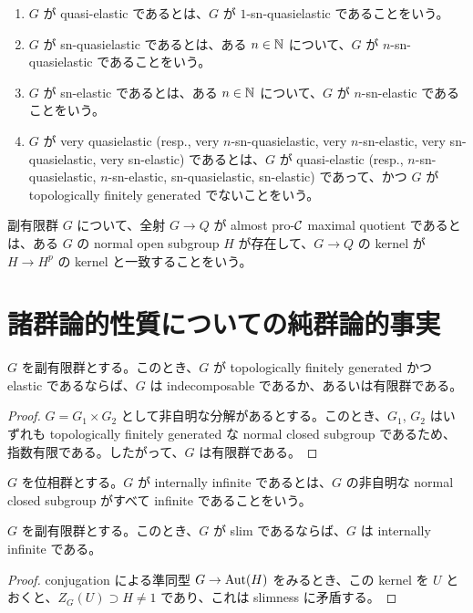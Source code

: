 \begin{defn}
\begin{enumerate}
    \item $G$ が quasi-elastic であるとは、$G$ が $1$-sn-quasielastic であることをいう。
    \item $G$ が sn-quasielastic であるとは、ある $n \in \mathbb{N}$ について、$G$ が $n$-sn-quasielastic であることをいう。
    \item $G$ が sn-elastic であるとは、ある $n \in \mathbb{N}$ について、$G$ が $n$-sn-elastic であることをいう。
    \item $G$ が very quasielastic (resp., very $n$-sn-quasielastic, very $n$-sn-elastic, very sn-quasielastic, very sn-elastic) であるとは、$G$ が quasi-elastic (resp., $n$-sn-quasielastic, $n$-sn-elastic, sn-quasielastic, sn-elastic) であって、かつ $G$ が topologically finitely generated でないことをいう。
  \end{enumerate}
\end{defn}

\begin{defn}\label{0004}
  副有限群 $G$ について、全射 $G \to Q$ が almost pro-$\mathcal{C}$ maximal quotient であるとは、ある $G$ の normal open subgroup $H$ が存在して、$G \to Q$ の kernel が $H \to H^p$ の kernel と一致することをいう。
\end{defn}

\section{諸群論的性質についての純群論的事実}

\begin{lem}\label{0002}
  $G$ を副有限群とする。このとき、$G$ が topologically finitely generated かつ elastic であるならば、$G$ は indecomposable であるか、あるいは有限群である。
\end{lem}
\begin{proof}
  $G = G_1 \times G_2$ として非自明な分解があるとする。このとき、$G_1$, $G_2$ はいずれも topologically finitely generated な normal closed subgroup であるため、指数有限である。したがって、$G$ は有限群である。
\end{proof}

\begin{defn}\label{0007}
  $G$ を位相群とする。$G$ が internally infinite であるとは、$G$ の非自明な normal closed subgroup がすべて infinite であることをいう。
\end{defn}

\begin{lem}\label{0006}
  $G$ を副有限群とする。このとき、$G$ が slim であるならば、$G$ は internally infinite である。
\end{lem}
\begin{proof}
  conjugation による準同型 $G \to \mathrm{Aut}(H)$ をみるとき、この kernel を $U$ とおくと、$Z_G(U) \supset H \neq 1$ であり、これは slimness に矛盾する。 
\end{proof}


